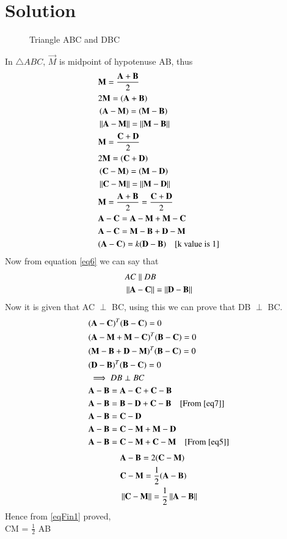 \documentclass[journal,12pt,twocolumn]{IEEEtran}
\begin{document}
\section{Solution}
\renewcommand{\thefigure}{1}
\begin{figure}[hb]
\centering
\resizebox{.9\linewidth}{!}{}
\caption{Triangle ABC and DBC}
\label{myfig}
\end{figure}
In $\triangle{ABC}$, $\vec{M}$ is midpoint of hypotenuse AB, thus 
\begin{align}
&\vec{M} = \frac{\vec{A}+\vec{B}}{2}\label{eq1} \\
&2\vec{M} = \brak{\vec{A+B}}\\
&\brak{\vec{A-M}} = \brak{\vec{M-B}}\\
&\norm{\vec{A}-\vec{M}}=\norm{\vec{M}-\vec{B}}\label{eq4} \\
&\vec{M} = \frac{\vec{C}+\vec{D}}{2}\label{eq2} \\
&2\vec{M} = \brak{\vec{C+D}}\\
&\brak{\vec{C-M}} = \brak{\vec{M-D}}\\
&\norm{\vec{C}-\vec{M}}=\norm{\vec{M}-\vec{D}}\label{eq5} \\
&\vec{M} = \frac{\vec{A}+\vec{B}}{2} = \frac{\vec{C}+\vec{D}}{2}\label{eq3} \\
&\vec{A - C} = \vec{A - M} + \vec{M - C} \\
&\vec{A - C} = \vec{M - B} + \vec{D - M} \\
&(\vec{A - C}) = k(\vec{D - B})\label{eq6} \quad\text{[k value is 1]}
\end{align} 
Now from equation \eqref{eq6} we can say that 
\begin{align}
&AC \parallel DB\label{eq8} \\
&\norm{\vec{A - C}} = \norm{\vec{D - B}}\label{eq7} 
\end{align}
Now it is given that AC $\perp$ BC, using this we can prove that DB $\perp$ BC. 
\begin{align}
&(\vec A -\vec C)^T(\vec{B}-\vec{C}) = 0 \\
&(\vec A -\vec M +\vec M -\vec C)^T(\vec{B}-\vec{C}) = 0 \\
&(\vec M -\vec B +\vec D -\vec M)^T(\vec{B}-\vec{C}) = 0 \\
&(\vec D -\vec B)^T(\vec{B}-\vec{C}) = 0 \\
&\implies DB \perp BC \\
&\vec{A - B} = \vec{A - C}+\vec{C - B} \\
&\vec{A - B} = \vec{B - D}+\vec{C - B} \quad\text{[From \eqref{eq7}]} \\
&\vec{A - B} = \vec{C - D} \\
&\vec{A - B} = \vec{C - M}+ \vec{M - D} \\
&\vec{A - B} = \vec{C - M}+\vec{C - M} \quad\text{[From \eqref{eq5}]}
\end{align} 
\begin{align}
&\vec{A - B} = 2 (\vec{C - M}) \\
&\vec{C - M} = \frac{1}{2}(\vec{A - B}) \\
&\norm{\vec{C - M}} = \frac{1}{2}\norm{\vec{A - B}}\label{eqFin1}
\end{align}
Hence from \eqref{eqFin1} proved,\\CM = $\frac{1}{2}$ AB
\end{document}
